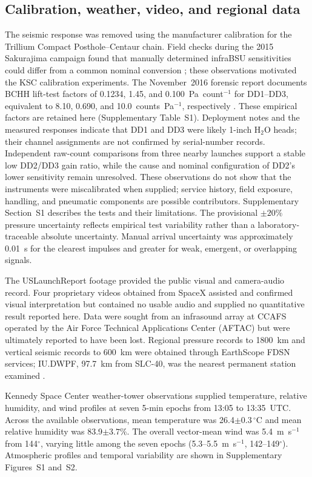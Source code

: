 \documentclass[]{seismica}
\begin{document}
\subsection{Calibration, weather, video, and regional data}

The seismic response was removed using the manufacturer calibration for the
Trillium Compact Posthole--Centaur chain. Field checks during the 2015
Sakurajima campaign found that manually determined infraBSU sensitivities
could differ from a common nominal conversion \citep{smith_sakurajima_2020};
these observations motivated the KSC calibration experiments. The
November~2016 forensic report documents BCHH lift-test factors of 0.1234,
1.45, and 0.100~Pa~count$^{-1}$ for DD1--DD3, equivalent to 8.10, 0.690, and
10.0~counts~Pa$^{-1}$, respectively \citep{thompson_mcnutt_fireball_2016}.
These empirical factors are retained here (Supplementary Table~S1).
Deployment notes and the measured responses indicate that DD1 and DD3 were
likely 1-inch H$_2$O heads; their channel assignments are not confirmed by
serial-number records. Independent raw-count comparisons from three nearby
launches support a stable low DD2/DD3 gain ratio, while the cause and nominal
configuration of DD2's lower sensitivity remain unresolved. These observations
do not show that the instruments were miscalibrated when supplied; service
history, field exposure, handling, and pneumatic components are possible
contributors. Supplementary Section~S1 describes the tests and their
limitations.
The provisional $\pm20\%$ pressure uncertainty reflects empirical test
variability rather than a laboratory-traceable absolute uncertainty. Manual
arrival uncertainty was approximately 0.01~s for the clearest impulses and
greater for weak, emergent, or overlapping signals.

The USLaunchReport footage provided the public visual and camera-audio record.
Four proprietary videos obtained from SpaceX assisted and confirmed visual
interpretation but contained no usable audio and supplied no quantitative
result reported here. Data were sought from an infrasound array at CCAFS
operated by the Air Force Technical Applications Center (AFTAC)
but were ultimately reported to have been lost. Regional pressure records to 1800~km
and vertical seismic records to 600~km were obtained through EarthScope FDSN
services; IU.DWPF, 97.7~km from SLC-40, was the nearest permanent station
examined \citep{asl_gsn_iu_1988}.

Kennedy Space Center weather-tower observations supplied temperature,
relative humidity, and wind profiles at seven 5-min epochs from 13:05 to
13:35~UTC. Across the available observations, mean temperature was
26.4$\pm0.3\,^{\circ}$C and mean relative humidity was
83.9$\pm3.7\%$. The overall vector-mean wind was 5.4~m~s$^{-1}$ from
144$^\circ$, varying little among the seven epochs (5.3--5.5~m~s$^{-1}$,
142--149$^\circ$).
Atmospheric profiles and temporal variability are shown in Supplementary
Figures~S1 and~S2.
\end{document}
